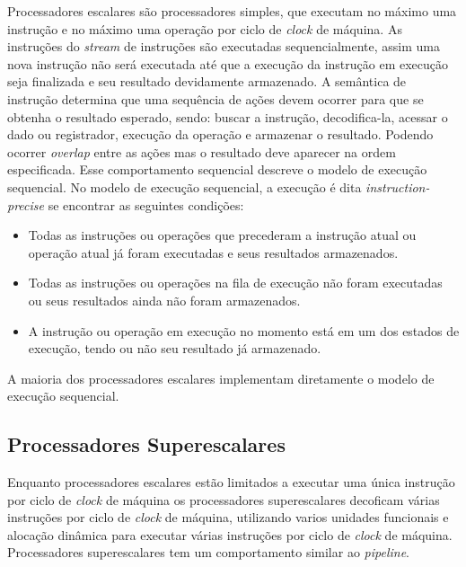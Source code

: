 Processadores escalares são processadores simples, que executam no 
máximo uma instrução e no máximo uma operação por ciclo de \textit{clock} de 
máquina. 
As instruções do \textit{stream} de instruções são executadas 
sequencialmente, assim uma nova instrução não será executada até que a execução 
da instrução em execução seja finalizada e seu resultado devidamente
armazenado.
A semântica de instrução determina que uma sequência de ações devem ocorrer
para que se obtenha o resultado esperado, sendo: buscar a instrução,
decodifica-la, acessar o dado ou registrador, execução da operação e armazenar o
resultado. 
Podendo ocorrer \textit{overlap} entre as ações mas o resultado deve
aparecer na ordem especificada.
Esse comportamento sequencial descreve o modelo de execução sequencial.
No modelo de execução sequencial, a execução é dita \textit{instruction-precise}
se encontrar as seguintes condições:

\begin{itemize}
        \item Todas as instruções ou operações que precederam a instrução atual
                ou operação atual já foram executadas e seus resultados
                armazenados.
        \item Todas as instruções ou operações na fila de execução não foram
                executadas ou seus resultados ainda não foram armazenados.
        \item A instrução ou operação em execução no momento está em um dos
                estados de execução, tendo ou não seu resultado já armazenado.
\end{itemize}

A maioria dos processadores escalares implementam diretamente o modelo de
execução sequencial.


\subsection{Processadores Superescalares}

Enquanto processadores escalares estão limitados a executar uma única instrução 
por ciclo de \textit{clock} de máquina os processadores superescalares decoficam
várias instruções por ciclo de \textit{clock} de máquina, utilizando varios
unidades funcionais e alocação dinâmica para executar várias instruções por
ciclo de \textit{clock} de máquina. 
Processadores superescalares tem um comportamento similar ao \textit{pipeline}.

